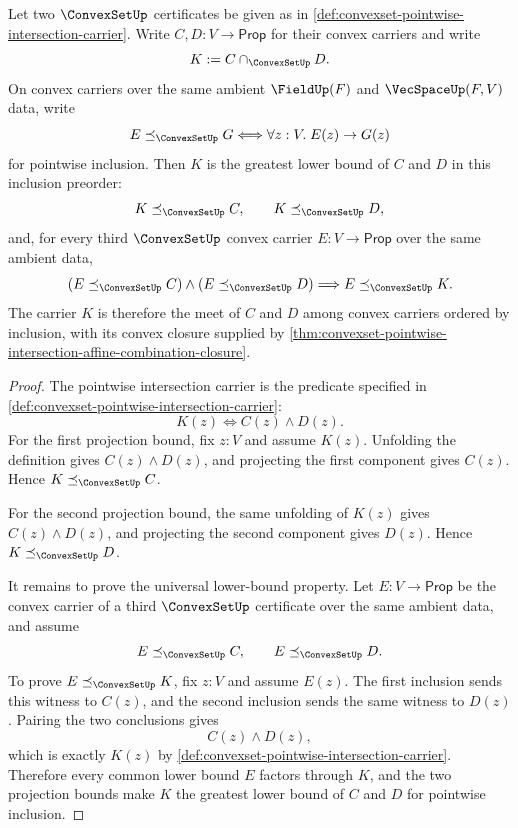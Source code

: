 \begin{theorem}
\label{thm:convexset-pointwise-intersection-inclusion-meet}
Let two $\ConvexSetUp$ certificates be given as in \autoref{def:convexset-pointwise-intersection-carrier}. Write $C,D:V\to\mathsf{Prop}$ for their convex carriers and write
$$
K:=C\cap_{\ConvexSetUp}D.
$$
On convex carriers over the same ambient $\FieldUp(F)$ and $\VecSpaceUp(F,V)$ data, write
$$
E\preceq_{\ConvexSetUp}G
\Longleftrightarrow
\forall z:V.\;E(z)\to G(z)
$$
for pointwise inclusion. Then $K$ is the greatest lower bound of $C$ and $D$ in this inclusion preorder:
$$
K\preceq_{\ConvexSetUp}C,
\qquad
K\preceq_{\ConvexSetUp}D,
$$
and, for every third $\ConvexSetUp$ convex carrier $E:V\to\mathsf{Prop}$ over the same ambient data,
$$
(E\preceq_{\ConvexSetUp}C)\land(E\preceq_{\ConvexSetUp}D)
\Longrightarrow
E\preceq_{\ConvexSetUp}K.
$$
The carrier $K$ is therefore the meet of $C$ and $D$ among convex carriers ordered by inclusion, with its convex closure supplied by \autoref{thm:convexset-pointwise-intersection-affine-combination-closure}.
\end{theorem}
\begin{proof}
The pointwise intersection carrier is the predicate specified in \autoref{def:convexset-pointwise-intersection-carrier}:
$$
K(z)\Longleftrightarrow C(z)\land D(z).
$$
For the first projection bound, fix $z:V$ and assume $K(z)$. Unfolding the definition gives $C(z)\land D(z)$, and projecting the first component gives $C(z)$. Hence $K\preceq_{\ConvexSetUp}C$.

For the second projection bound, the same unfolding of $K(z)$ gives $C(z)\land D(z)$, and projecting the second component gives $D(z)$. Hence $K\preceq_{\ConvexSetUp}D$.

It remains to prove the universal lower-bound property. Let $E:V\to\mathsf{Prop}$ be the convex carrier of a third $\ConvexSetUp$ certificate over the same ambient data, and assume
$$
E\preceq_{\ConvexSetUp}C,
\qquad
E\preceq_{\ConvexSetUp}D.
$$
To prove $E\preceq_{\ConvexSetUp}K$, fix $z:V$ and assume $E(z)$. The first inclusion sends this witness to $C(z)$, and the second inclusion sends the same witness to $D(z)$. Pairing the two conclusions gives
$$
C(z)\land D(z),
$$
which is exactly $K(z)$ by \autoref{def:convexset-pointwise-intersection-carrier}. Therefore every common lower bound $E$ factors through $K$, and the two projection bounds make $K$ the greatest lower bound of $C$ and $D$ for pointwise inclusion.
\end{proof}

